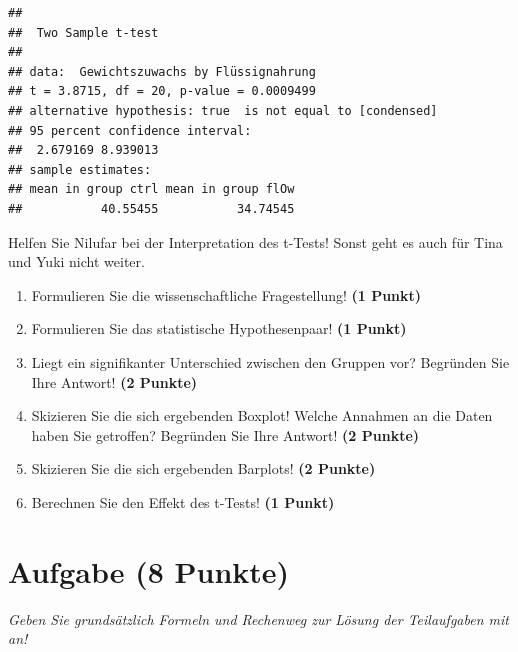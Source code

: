 \documentclass[a4paper, 9pt]{scrartcl}\usepackage[]{graphicx}\usepackage[]{xcolor}
\makeatletter
\newenvironment{kframe}{%
 \def\at@end@of@kframe{}%
 \ifinner\ifhmode%
  \def\at@end@of@kframe{\end{minipage}}%
  \begin{minipage}{\columnwidth}%
 \fi\fi%
 \def\FrameCommand##1{\hskip\@totalleftmargin \hskip-\fboxsep
 \colorbox{shadecolor}{##1}\hskip-\fboxsep
     \hskip-\linewidth \hskip-\@totalleftmargin \hskip\columnwidth}%
 \MakeFramed {\advance\hsize-\width
   \@totalleftmargin\z@ \linewidth\hsize
   \@setminipage}}%
 {\par\unskip\endMakeFramed%
 \at@end@of@kframe}
\newenvironment{knitrout}{}{} %
\makeatother
\begin{document}
\begin{knitrout}
\color{fgcolor}\begin{kframe}
\begin{verbatim}
## 
## 	Two Sample t-test
## 
## data:  Gewichtszuwachs by Flüssignahrung
## t = 3.8715, df = 20, p-value = 0.0009499
## alternative hypothesis: true  is not equal to [condensed]
## 95 percent confidence interval:
##  2.679169 8.939013
## sample estimates:
## mean in group ctrl mean in group flOw 
##           40.55455           34.74545
\end{verbatim}
\end{kframe}
\end{knitrout}

Helfen Sie Nilufar bei der Interpretation des t-Tests! Sonst geht es auch für Tina und Yuki nicht weiter.
  
\begin{enumerate}
  \item Formulieren Sie die wissenschaftliche Fragestellung! \textbf{(1 Punkt)}
  \item Formulieren Sie das statistische Hypothesenpaar! \textbf{(1 Punkt)}
\item Liegt ein signifikanter Unterschied zwischen den Gruppen vor?
  Begründen Sie Ihre Antwort! \textbf{(2 Punkte)}
\item Skizieren Sie die sich ergebenden Boxplot!
  Welche Annahmen an die Daten haben Sie getroffen? Begründen Sie Ihre
  Antwort! \textbf{(2 Punkte)} 
\item Skizieren Sie die sich ergebenden Barplots! \textbf{(2 Punkte)}
\item Berechnen Sie den Effekt des t-Tests! \textbf{(1 Punkt)}
\end{enumerate}
 
\clearpage

\section{Aufgabe \hfill (8 Punkte)}

\textit{Geben Sie grundsätzlich Formeln und Rechenweg zur Lösung der Teilaufgaben mit an!} \\[1Ex]
 
\end{document}
